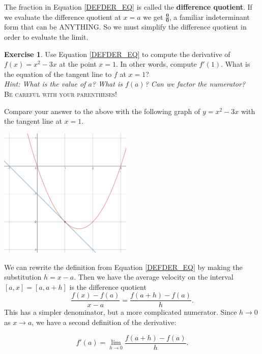 \documentclass[11pt,reqno,final]{amsart}
\numberwithin{figure}{section}
\theoremstyle{definition} %
\newtheorem{exercise}[question]{Exercise}
\newcommand{\dlim}{\displaystyle\lim}
\begin{document}
The fraction in Equation \cref{DEFDER_EQ} is called the \textbf{difference quotient}.
If we evaluate the difference quotient at $x = a$ we get $\mathbf{\frac{0}{0}}$,
a familiar indeterminant form that can be ANYTHING.
So we must simplify the difference quotient in order to evaluate the limit.

\begin{exercise}
        Use Equation \cref{DEFDER_EQ} to compute the derivative of $f(x) = x^2 - 3x$ at the point $x = 1$.
        In other words, compute $f'(1)$.  What is the equation of the tangent line to $f$ at $x = 1$?\\
        \textit{Hint: What is the value of $a$? What is $f(a)$? Can we factor the numerator?}\\
        \textsc{Be careful with your parentheses!}       
\end{exercise}

\newpage

Compare your answer to the above with the following graph of $y = x^2 - 3x$ with the tangent line at $x = 1$.
\begin{center}
        \includegraphics[width=2.5in]{10-05P_tan.png}
\end{center}

We can rewrite the definition from Equation \cref{DEFDER_EQ} by making the substitution $h = x-a$.
Then we have the average velocity on the interval $[a,x] = [a,a+h]$ is the difference quotient
\[
        \dfrac{f(x) - f(a)}{x-a} = \dfrac{f(a+h) - f(a)}{h}.
\]
This has a simpler denominator, but a more complicated numerator.
Since $h \to 0$ as $x \to a$, we have a second definition of the derivative:
\begin{framed}
        \begin{equation}
                \label{DEFDER2_EQ}
                f'(a) = \dlim_{h \to 0}\dfrac{f(a+h) - f(a)}{h}.
        \end{equation}
\end{framed}
\end{document}
